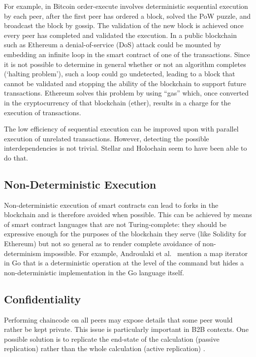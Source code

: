For example, in Bitcoin order-execute involves deterministic sequential execution by each peer, after the first peer has ordered a block, solved the PoW puzzle, and broadcast the block by gossip. The validation of the new block is achieved once every peer has completed and validated the execution. In a public blockchain such as Ethereum a denial-of-service (DoS) attack could be mounted by embedding an infinite loop in the smart contract of one of the transactions. Since it is not possible to determine in general whether or not an algorithm completes (`halting problem'), such a loop could go undetected, leading to a block that cannot be validated and stopping the ability of the blockchain to support future transactions. Ethereum solves this problem by using ``gas'' which, once converted in the cryptocurrency of that blockchain (ether), results in a charge for the execution of transactions.

The low efficiency of sequential execution can be improved upon with parallel execution of unrelated transactions. However, detecting the possible interdependencies is not trivial. Stellar and Holochain seem to have been able to do that.

\subsection{Non-Deterministic Execution}
Non-deterministic execution of smart contracts can lead to forks in the blockchain and is therefore avoided when possible. This can be achieved by means of smart contract languages that are not Turing-complete: they should be expressive enough for the purposes of the blockchain they serve (like Solidity for Ethereum) but not so general as to render complete avoidance of non-determinism impossible. For example, Androulaki et al.\ \cite{AndroulakiEtAl2018} mention a map iterator in Go that is a deterministic operation at the level of the command but hides a non-deterministic implementation in the Go language itself.

\subsection{Confidentiality}
Performing chaincode on all peers may expose details that some peer would rather be kept private. This issue is particularly important in B2B contexts. One possible solution is to replicate the end-state of the calculation (passive replication) rather than the whole calculation (active replication) \cite{AndroulakiEtAl2018}.

